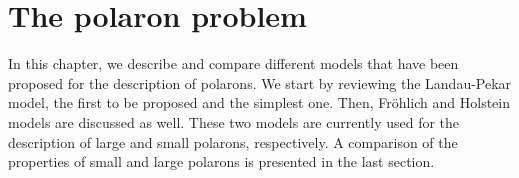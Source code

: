 \chapter{The polaron problem} \label{ch:polarons}

In this chapter, we describe and compare different models that have been proposed for the description of polarons. We start by reviewing the Landau-Pekar model, the first to be proposed and the simplest one. Then, Fröhlich and Holstein models are discussed as well. These two models are currently used for the description of large and small polarons, respectively. A comparison of the properties of small and large polarons is presented in the last section.




